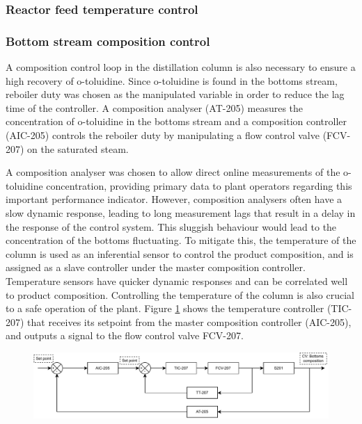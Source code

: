 \subsubsection{Reactor feed temperature control}%

\subsubsection{Bottom stream composition control} %
A composition control loop in the distillation column is also necessary to ensure a high recovery of o-toluidine. Since o-toluidine is found in the bottoms stream, reboiler duty was chosen as the manipulated variable in order to reduce the lag time of the controller. A composition analyser (AT-205) measures the concentration of o-toluidine in the bottoms stream and a composition controller (AIC-205) controls the reboiler duty by manipulating a flow control valve (FCV-207) on the saturated steam. 

A composition analyser was chosen to allow direct online measurements of the o-toluidine concentration, providing primary data to plant operators regarding this important performance indicator. However, composition analysers often have a slow dynamic response, leading to long measurement lags that result in a delay in the response of the control system. This sluggish behaviour would lead to the concentration of the bottoms fluctuating. To mitigate this, the temperature of the column is used as an inferential sensor to control the product composition, and is assigned as a slave controller under the master composition controller. Temperature sensors have quicker dynamic responses and can be correlated well to product composition. Controlling the temperature of the column is also crucial to a safe operation of the plant. Figure \ref{fig:S201-CC} shows the temperature controller (TIC-207) that receives its setpoint from the master composition controller (AIC-205), and outputs a signal to the flow control valve FCV-207.

\begin{figure}
    \centering
    \includegraphics[width=\linewidth]{chapters/4-operation-control/4-Figures/S201-CC.pdf}
    \caption{}
    \label{fig:S201-CC}
\end{figure}



